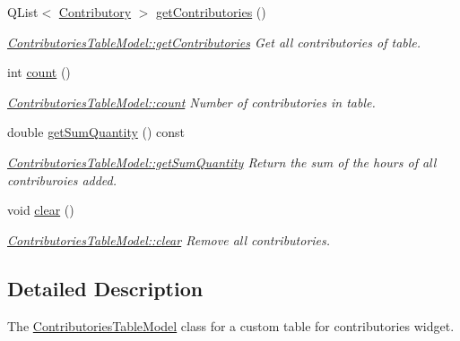 \begin{DoxyCompactItemize}
Q\+List$<$ \hyperlink{classModels_1_1Contributory}{Contributory} $>$ \hyperlink{classGui_1_1Widgets_1_1WdgModels_1_1ContributoriesTableModel_af20bc21f24f7597b6b7d053d11d02d97}{get\+Contributories} ()
\begin{DoxyCompactList}\small\item\em \hyperlink{classGui_1_1Widgets_1_1WdgModels_1_1ContributoriesTableModel_af20bc21f24f7597b6b7d053d11d02d97}{Contributories\+Table\+Model\+::get\+Contributories} Get all contributories of table. \end{DoxyCompactList}\item 
int \hyperlink{classGui_1_1Widgets_1_1WdgModels_1_1ContributoriesTableModel_acc01a97c00bb57e6733f697fc45be0ed}{count} ()
\begin{DoxyCompactList}\small\item\em \hyperlink{classGui_1_1Widgets_1_1WdgModels_1_1ContributoriesTableModel_acc01a97c00bb57e6733f697fc45be0ed}{Contributories\+Table\+Model\+::count} Number of contributories in table. \end{DoxyCompactList}\item 
double \hyperlink{classGui_1_1Widgets_1_1WdgModels_1_1ContributoriesTableModel_ac62bb6714ddcccb0ed2bfb2babb4c075}{get\+Sum\+Quantity} () const 
\begin{DoxyCompactList}\small\item\em \hyperlink{classGui_1_1Widgets_1_1WdgModels_1_1ContributoriesTableModel_ac62bb6714ddcccb0ed2bfb2babb4c075}{Contributories\+Table\+Model\+::get\+Sum\+Quantity} Return the sum of the hours of all contriburoies added. \end{DoxyCompactList}\item 
\hypertarget{classGui_1_1Widgets_1_1WdgModels_1_1ContributoriesTableModel_aa7854991b9d25db6c3eb55b638f81d6d}{}void \hyperlink{classGui_1_1Widgets_1_1WdgModels_1_1ContributoriesTableModel_aa7854991b9d25db6c3eb55b638f81d6d}{clear} ()\label{classGui_1_1Widgets_1_1WdgModels_1_1ContributoriesTableModel_aa7854991b9d25db6c3eb55b638f81d6d}

\begin{DoxyCompactList}\small\item\em \hyperlink{classGui_1_1Widgets_1_1WdgModels_1_1ContributoriesTableModel_aa7854991b9d25db6c3eb55b638f81d6d}{Contributories\+Table\+Model\+::clear} Remove all contributories. \end{DoxyCompactList}\end{DoxyCompactItemize}


\subsection{Detailed Description}
The \hyperlink{classGui_1_1Widgets_1_1WdgModels_1_1ContributoriesTableModel}{Contributories\+Table\+Model} class for a custom table for contributories widget. 

